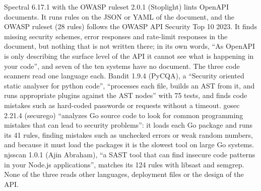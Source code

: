 \documentclass[conference]{IEEEtran}
\begin{document}
Spectral 6.17.1 with the OWASP ruleset 2.0.1 (Stoplight) lints OpenAPI documents. It runs rules on the JSON or YAML of the document, and the OWASP ruleset (28 rules) follows the OWASP API Security Top 10 2023. It finds missing security schemes, error responses and rate-limit responses in the document, but nothing that is not written there; in its own words, ``As OpenAPI is only describing the surface level of the API it cannot see what is happening in your code'', and seven of the ten systems have no document. The three code scanners read one language each. Bandit 1.9.4 (PyCQA), a ``Security oriented static analyser for python code'', ``processes each file, builds an AST from it, and runs appropriate plugins against the AST nodes'' with 75 tests, and finds code mistakes such as hard-coded passwords or requests without a timeout. gosec 2.21.4 (securego) ``analyzes Go source code to look for common programming mistakes that can lead to security problems'': it loads each Go package and runs its 41 rules, finding mistakes such as unchecked errors or weak random numbers, and because it must load the packages it is the slowest tool on large Go systems. njsscan 1.0.1 (Ajin Abraham), ``a SAST tool that can find insecure code patterns in your Node.js applications'', matches its 124 rules with libsast and semgrep. None of the three reads other languages, deployment files or the design of the API.
\end{document}
